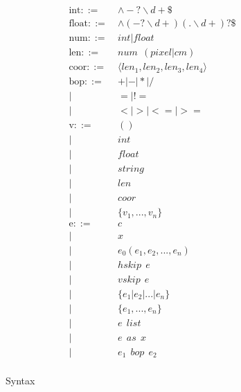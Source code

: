 \begin{figure}[h]
\small
\begin{align*}
\text{int} ::=~& \land-?\backslash d+\$\\
\text{float} ::=~& \land(-?\backslash d+)(.\backslash d+)?\$\\
\text{num} ::=~& int|float\\
\text{len} ::=~& num ~~ (pixel|cm)\\
\text{coor} ::=~& \langle len_1, len_2, len_3, len_4\rangle\\
\text{bop} ::= 
~& +|-|*|/\\
|~&=|!=\\
|~&<|>|<=|>=\\
\text{v} ::=~& 
() \\
|~& int \\
|~& float \\
|~& string \\
|~& len \\
|~& coor \\
|~& \{v_1, ..., v_n\} \\
\text{e} ::= 
~& c \tag{constant}\label{syntax:constant}\\
|~& x \tag{name}\label{syntax:name}\\
|~& e_0(e_1, e_2, ..., e_n) \tag{constraints} \label{syntax:constraints}\\
|~& hskip ~~e \tag{horizontal skip}\label{syntax:hskip}\\
|~& vskip ~~e \tag{vertical skip}\label{syntax:vskip}\\
|~& \{e_1 | e_2 | ... | e_n\} \tag{union}\label{syntax:union}\\
|~& \{e_1, ..., e_n\} \tag{struct}\label{syntax:struct}\\
|~& e ~~ list \tag{list}\label{syntax:list}\\
|~& e ~~ as ~~ x \tag{blinding}\label{syntax:blinding}\\
|~& e_1 ~~ bop ~~ e_2 \tag{binary operation}\label{syntax:bop}\\
\end{align*}
\caption{Syntax}
\label{fig:syntax}
\end{figure}


